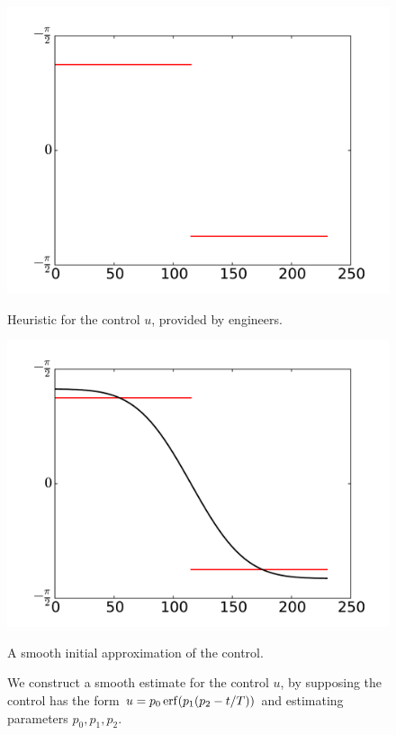 \begin{figure}
\begin{minipage}[b]{.47\linewidth}
\centering
\includegraphics[width=\textwidth]{u_heuristic.pdf}
\caption*{Heuristic for the control $u$, provided by engineers. }
\end{minipage}
\hspace{0.5cm}
\begin{minipage}[b]{0.47\linewidth}
\centering
\includegraphics[width=\textwidth]{u_heuristic_smooth.pdf}
\caption*{A smooth initial approximation of the control.}
\end{minipage}
\caption{We construct a smooth estimate for the control $u$, by supposing the control has the form 
$u = p_0\operatorname{erf}(p_1(p_2-t/T))$ and estimating parameters $p_0, p_1, p_2$.}
\label{fig:reentry:estimate_u}
\end{figure}


